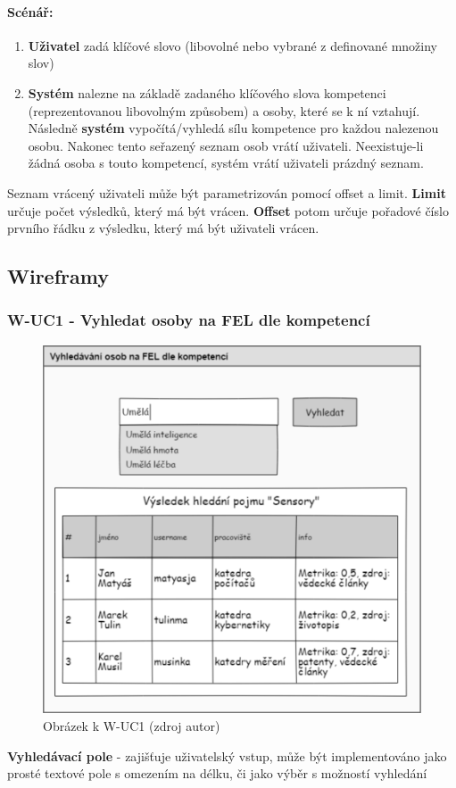 \paragraph{Scénář:}
\begin{enumerate}
    \item \textbf{Uživatel} zadá klíčové slovo (libovolné nebo vybrané z definované množiny slov)
    \item \textbf{Systém} nalezne na základě zadaného klíčového slova kompetenci (reprezentovanou libovolným způsobem) a osoby, které se k ní vztahují. Následně \textbf{systém} vypočítá/vyhledá sílu kompetence pro každou nalezenou osobu. Nakonec tento seřazený seznam osob vrátí uživateli. Neexistuje-li žádná osoba s touto kompetencí, systém vrátí uživateli prázdný seznam. 
\end{enumerate}
Seznam vrácený uživateli může být parametrizován pomocí offset a limit. \textbf{Limit} určuje počet výsledků, který má být vrácen. \textbf{Offset} potom určuje pořadové číslo prvního řádku z výsledku, který má být uživateli vrácen.
\subsection{Wireframy}
\subsubsection{W-UC1 - Vyhledat osoby na FEL dle kompetencí}
\begin{figure}[htbp!]
	\includegraphics[width=0.9\linewidth]{img/W-UC1.png}
	\caption{Obrázek k W-UC1 (zdroj autor)}
	\label{fig:w-uc1}
\end{figure}
 \noindent \textbf{Vyhledávací pole} - zajišťuje uživatelský vstup, může být implementováno jako prosté textové pole s omezením na délku, či jako výběr s možností vyhledání\par
